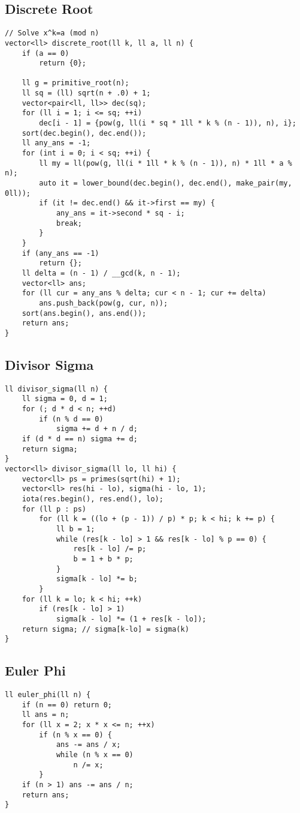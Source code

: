 \documentclass[landscape, 8pt, a4paper, oneside]{extarticle}
\begin{document}
\begin{multicols}{3}
\subsection{Discrete Root}
\begin{verbatim}
// Solve x^k=a (mod n)
vector<ll> discrete_root(ll k, ll a, ll n) {
    if (a == 0)
        return {0};

    ll g = primitive_root(n);
    ll sq = (ll) sqrt(n + .0) + 1;
    vector<pair<ll, ll>> dec(sq);
    for (ll i = 1; i <= sq; ++i)
        dec[i - 1] = {pow(g, ll(i * sq * 1ll * k % (n - 1)), n), i};
    sort(dec.begin(), dec.end());
    ll any_ans = -1;
    for (int i = 0; i < sq; ++i) {
        ll my = ll(pow(g, ll(i * 1ll * k % (n - 1)), n) * 1ll * a % n);
        auto it = lower_bound(dec.begin(), dec.end(), make_pair(my, 0ll));
        if (it != dec.end() && it->first == my) {
            any_ans = it->second * sq - i;
            break;
        }
    }
    if (any_ans == -1)
        return {};
    ll delta = (n - 1) / __gcd(k, n - 1);
    vector<ll> ans;
    for (ll cur = any_ans % delta; cur < n - 1; cur += delta)
        ans.push_back(pow(g, cur, n));
    sort(ans.begin(), ans.end());
    return ans;
}
\end{verbatim}
\subsection{Divisor Sigma}
\begin{verbatim}
ll divisor_sigma(ll n) {
    ll sigma = 0, d = 1;
    for (; d * d < n; ++d)
        if (n % d == 0)
            sigma += d + n / d;
    if (d * d == n) sigma += d;
    return sigma;
}
vector<ll> divisor_sigma(ll lo, ll hi) {
    vector<ll> ps = primes(sqrt(hi) + 1);
    vector<ll> res(hi - lo), sigma(hi - lo, 1);
    iota(res.begin(), res.end(), lo);
    for (ll p : ps)
        for (ll k = ((lo + (p - 1)) / p) * p; k < hi; k += p) {
            ll b = 1;
            while (res[k - lo] > 1 && res[k - lo] % p == 0) {
                res[k - lo] /= p;
                b = 1 + b * p;
            }
            sigma[k - lo] *= b;
        }
    for (ll k = lo; k < hi; ++k)
        if (res[k - lo] > 1)
            sigma[k - lo] *= (1 + res[k - lo]);
    return sigma; // sigma[k-lo] = sigma(k)
}
\end{verbatim}
\subsection{Euler Phi}
\begin{verbatim}
ll euler_phi(ll n) {
    if (n == 0) return 0;
    ll ans = n;
    for (ll x = 2; x * x <= n; ++x)
        if (n % x == 0) {
            ans -= ans / x;
            while (n % x == 0)
                n /= x;
        }
    if (n > 1) ans -= ans / n;
    return ans;
}


\end{verbatim}
\end{multicols}
\end{document}
